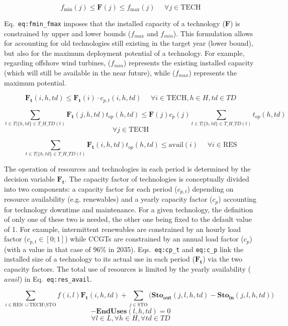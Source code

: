 \documentclass[
]{article}
\begin{document}
{\[f_{\text{min}} (j) \leq \textbf{F}(j) \leq f_{\text{max}} (j) ~~~~~~ \forall j \in \text{TECH}\]}

Eq.~\texttt{eq:fmin\_fmax} imposes that the installed capacity of a
technology (\textbf{F}) is constrained by upper and lower bounds
(\(f_{max}\) and \(f_{min}\)). This formulation allows for accounting
for old technologies still existing in the target year (lower bound),
but also for the maximum deployment potential of a technology. For
example, regarding offshore wind turbines, (\(f_{min}\)) represents the
existing installed capacity (which will still be available in the near
future), while (\(f_{max}\)) represents the maximum potential.

{\[\textbf{F}_\textbf{t}(i,h,td) \leq \textbf{F}_\textbf{t}(i) \cdot c_{p,t} (i,h,td) ~~~~~~ \forall i \in \text{TECH}, h \in H, td \in TD\]}

{\[\sum_{t \in T| \{h,td\} \in T\_H\_TD(t)} \textbf{F}_\textbf{t}(j,h,td) t_{op}(h,td)  \leq   \textbf{F} (j) c_{p} (j) \sum_{t \in T| \{h,td\} \in T\_H\_TD(t)} t_{op} (h,td)\]\[\forall j \in \text{TECH}\]}

{\[\sum_{t \in T| \{h,td\} \in T\_H\_TD(t)} \textbf{F}_\textbf{t}(i,h,td) t_{op}(h,td)  \leq \text{avail} (i) ~~~~~~ \forall i \in \text{RES}\]}

The operation of resources and technologies in each period is determined
by the decision variable \(\textbf{F}_{\textbf{t}}\). The capacity
factor of technologies is conceptually divided into two components: a
capacity factor for each period (\(c_{p,t}\)) depending on resource
availability (e.g. renewables) and a yearly capacity factor (\(c_{p}\))
accounting for technology downtime and maintenance. For a given
technology, the definition of only one of these two is needed, the other
one being fixed to the default value of 1. For example, intermittent
renewables are constrained by an hourly load factor
(\(c_{p,t}\in[0;1]\)) while CCGTs are constrained by an annual load
factor (\(c_{p}\)) (with a value in that case of 96\% in 2035).
Eqs.~\texttt{eq:cp\_t} and \texttt{eq:c\_p} link the installed size of a
technology to its actual use in each period
(\(\textbf{F}_{\textbf{t}}\)) via the two capacity factors. The total
use of resources is limited by the yearly availability (\(avail\)) in
Eq.~\texttt{eq:res\_avail}.

{\[\sum_{i \in \text{RES}~\cup \text{TECH} \setminus \text{STO}} f(i,l) \textbf{F}_\textbf{t}(i,h,td) + \sum_{j \in \text{STO}} \bigg(\textbf{Sto}_\textbf{out}(j,l,h,td) - \textbf{Sto}_\textbf{in}(j,l,h,td)\bigg)\]\[- \textbf{EndUses}(l,h,td) = 0\]\[\forall l \in L, \forall h \in H, \forall td \in TD\]}
\end{document}
